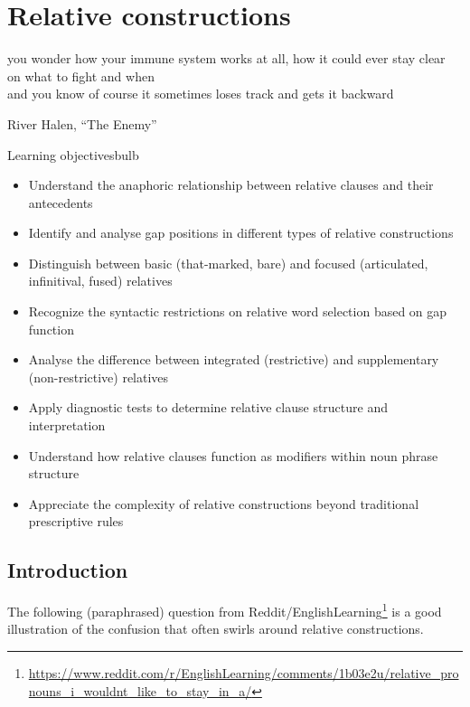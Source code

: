 \chapter{Relative constructions} \label{ch:relatives}

\epigraph{you wonder how your immune system works at all, how it could ever stay clear on what to fight and when\\[0.5em]
and you know of course it sometimes loses track and gets it backward}{River Halen, \enquote{The Enemy}}

\begin{tblsframedsymbol}{Learning objectives}{bulb}
\begin{itemize}[noitemsep, leftmargin=*]
    \item Understand the anaphoric relationship between relative clauses and their antecedents
    \item Identify and analyse gap positions in different types of relative constructions
    \item Distinguish between basic (that-marked, bare) and focused (articulated, infinitival, fused) relatives
    \item Recognize the syntactic restrictions on relative word selection based on gap function
    \item Analyse the difference between integrated (restrictive) and supplementary (non-restrictive) relatives
    \item Apply diagnostic tests to determine relative clause structure and interpretation
    \item Understand how relative clauses function as modifiers within noun phrase structure
    \item Appreciate the complexity of relative constructions beyond traditional prescriptive rules
\end{itemize}
\end{tblsframedsymbol}


\section{Introduction} 

The following (paraphrased) question from Reddit/EnglishLearning\footnote{\url{https://www.reddit.com/r/EnglishLearning/comments/1b03e2u/relative_pronouns_i_wouldnt_like_to_stay_in_a/}} is a good illustration of the confusion that often swirls around relative constructions.

